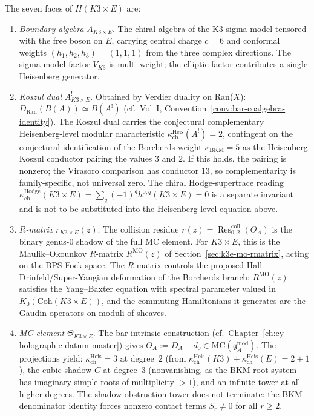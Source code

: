 \begin{construction}
\label{constr:k3e-holographic-datum}
The seven faces of $H(K3 \times E)$ are:
\begin{enumerate}[label=\textup{(\roman*)}]
 \item \emph{Boundary algebra} $A_{K3 \times E}$. The chiral algebra
 of the K3 sigma model tensored with the free boson on $E$,
 carrying central charge $c = 6$ and conformal weights
 $(h_1, h_2, h_3) = (1, 1, 1)$ from the three complex directions.
 The sigma model factor $V_{K3}$ is multi-weight;
 the elliptic factor contributes a single Heisenberg generator.

 \item \emph{Koszul dual} $A^!_{K3 \times E}$. Obtained by
 Verdier duality on Ran($X$): $D_{\mathrm{Ran}}(B(A)) \simeq B(A^!)$
 (cf.\ Vol~I, Convention~\ref{conv:bar-coalgebra-identity}).
 The Koszul dual carries the conjectural complementary Heisenberg-level
 modular characteristic
 $\kappa_{\mathrm{ch}}^{\mathrm{Heis}}(A^!) = 2$,
 contingent on the conjectural identification of the Borcherds weight
 $\kappa_{\mathrm{BKM}}=5$ as the Heisenberg Koszul conductor pairing
 the values $3$ and $2$. If this holds, the pairing is nonzero;
 the Virasoro comparison has conductor $13$, so complementarity is
 family-specific, not universal zero. The chiral Hodge-supertrace reading
 $\kappa_{\mathrm{ch}}^{\mathrm{Hodge}}(K3 \times E) = \sum_q (-1)^q h^{0, q}(K3 \times E) = 0$ is a separate invariant and is
 not to be substituted into the Heisenberg-level equation above.

 \item \emph{$R$-matrix} $r_{K3 \times E}(z)$. The collision
 residue $r(z) = \operatorname{Res}^{\mathrm{coll}}_{0,2}(\Theta_A)$
 is the binary genus-$0$ shadow of the full MC element. For
 $K3 \times E$, this is the Maulik--Okounkov $R$-matrix
 $R^{\mathrm{MO}}(z)$ of Section~\ref{sec:k3e-mo-rmatrix},
 acting on the BPS Fock space. The $R$-matrix controls the proposed
 Hall--Drinfeld/Super-Yangian deformation of the Borcherds branch:
 $R^{\mathrm{MO}}(z)$ satisfies the Yang--Baxter equation with spectral parameter
 valued in $K_0(\mathrm{Coh}(K3 \times E))$, and the commuting
 Hamiltonians it generates are the Gaudin operators on
 moduli of sheaves.

 \item \emph{MC element} $\Theta_{K3 \times E}$. The bar-intrinsic
 construction (cf.\ Chapter~\ref{ch:cy-holographic-datum-master})
 gives $\Theta_A := D_A - d_0 \in \mathrm{MC}(\mathfrak{g}^{\mathrm{mod}}_{A})$.
 The projections yield: $\kappa_{\mathrm{ch}}^{\mathrm{Heis}} = 3$ at degree~$2$
 (from $\kappa_{\mathrm{ch}}^{\mathrm{Heis}}(K3) + \kappa_{\mathrm{ch}}^{\mathrm{Heis}}(E) = 2 + 1$), the cubic
 shadow $C$ at degree~$3$ (nonvanishing, as the BKM root
 system has imaginary simple roots of multiplicity $> 1$),
 and an infinite tower at all higher degrees. The shadow
 obstruction tower does not terminate: the BKM denominator
 identity forces nonzero contact terms $S_r \neq 0$ for
 all $r \geq 2$.


\end{enumerate}
\end{construction}
